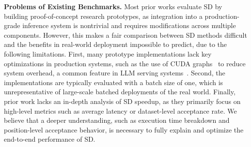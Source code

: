 \textbf{Problems of Existing Benchmarks.}
Most prior works evaluate SD by building proof-of-concept research prototypes, as integration into a production-grade inference system is nontrivial and requires modifications across multiple components.
However, this makes a fair comparison between SD methods difficult and the benefits in real-world deployment impossible to predict, due to the following limitations.
First, many prototype implementations lack key optimizations in production systems, such as the use of CUDA graphs~\cite{cudagraph} to reduce system overhead, a common feature in LLM serving systems~\cite{kwon2023efficient, zheng2024sglang}.
Second, the implementations are typically evaluated with a batch size of one, which is unrepresentative of large-scale batched deployments of the real world.
Finally, prior work lacks an in-depth analysis of SD speedup, as they primarily focus on high-level metrics such as average latency or dataset-level acceptance rate. \cite{li2024eagle,li2025eagle3,xia-etal-2024-unlocking}
We believe that a deeper understanding, such as execution time breakdown and position-level acceptance behavior, is necessary to fully explain and optimize the end-to-end performance of SD.